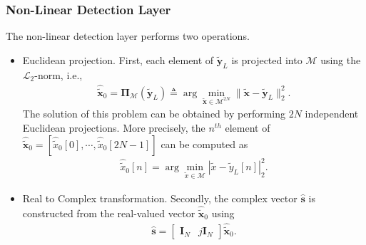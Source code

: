 \documentclass{article}
\begin{document}
\subsubsection{Non-Linear Detection Layer}

The non-linear detection layer performs two operations. 

\begin{itemize}
\item Euclidean projection. First, each element of $\tilde{\mathbf{y}}_{L}$ is projected into $\mathcal{M}$ using the $\mathcal{L}_2$-norm, i.e., 
\begin{align}
\widehat{\tilde{\mathbf{x}}}_0=\boldsymbol{\Pi}_{\mathcal{M}}(\tilde{\mathbf{y}}_{L})\triangleq \arg \min_{\tilde{\mathbf{x}} \in \mathcal{M}^{2N}} \|\tilde{\mathbf{x}} -\tilde{\mathbf{y}}_{L} \|^2_2.
\end{align}
The solution of this problem can be obtained by performing $2N$ independent Euclidean projections. More precisely, the $n^{th}$ element of $\widehat{\tilde{\mathbf{x}}}_0=[\widehat{\tilde{x}}_{0}[0],\cdots,\widehat{\tilde{x}}_{0}[2N-1]]$ can be computed as
\begin{align}
\widehat{\tilde{x}}_{0}[n]=\arg \min_{\tilde{x}\in \mathcal{M}}|\tilde{x}-\tilde{y}_{L}[n]|^2_2.
\end{align}
\item Real to Complex transformation. Secondly, the complex vector $\widehat{\mathbf{s}}$ is constructed from the real-valued vector $\widehat{\tilde{\mathbf{x}}}_0$ using
\begin{align}
\widehat{\mathbf{s}}=\begin{bmatrix}\mathbf{I}_N&j\mathbf{I}_N\end{bmatrix}\widehat{\tilde{\mathbf{x}}}_0.
\end{align}
\end{itemize}



\end{document}
